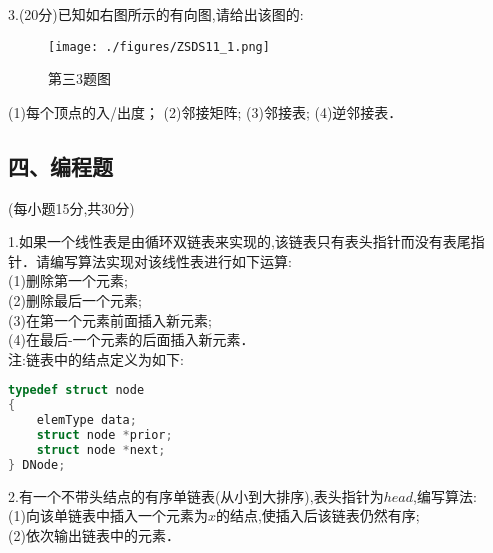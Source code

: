 3.(20分)已知如右图所示的有向图,请给出该图的:
\begin{figure}[ht]
\centering
\texttt{[image: ./figures/ZSDS11\_1.png]}
\caption{第三3题图} \label{ZSDS11_fig1}
\end{figure}
(1)每个顶点的入/出度；
(2)邻接矩阵;
(3)邻接表;
(4)逆邻接表．

\subsection{四、编程题}
(每小题15分,共30分)

1.如果一个线性表是由循环双链表来实现的,该链表只有表头指针而没有表尾指针．请编写算法实现对该线性表进行如下运算: \\
(1)删除第一个元素; \\
(2)删除最后一个元素; \\
(3)在第一个元素前面插入新元素; \\
(4)在最后-一个元素的后面插入新元素．\\
注:链表中的结点定义为如下:
\begin{lstlisting}[language=cpp]
typedef struct node
{
    elemType data;
    struct node *prior;
    struct node *next;
} DNode;
\end{lstlisting}

2.有一个不带头结点的有序单链表(从小到大排序),表头指针为$head$,编写算法: \\
(1)向该单链表中插入一个元素为$x$的结点,使插入后该链表仍然有序; \\
(2)依次输出链表中的元素．